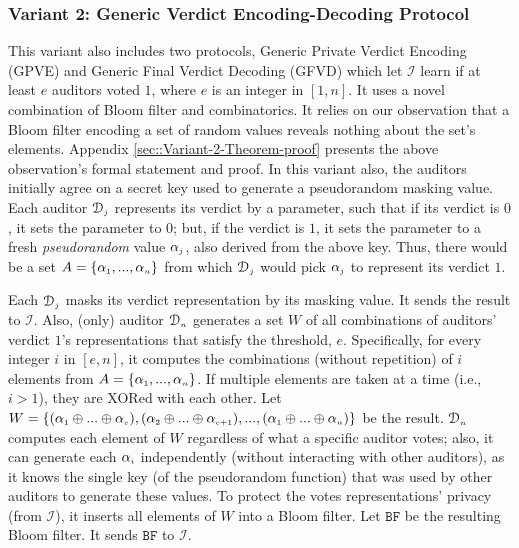 \vspace{-2mm}
\subsubsection{Variant 2: Generic Verdict  Encoding-Decoding Protocol} This variant also includes two protocols, Generic Private Verdict Encoding (GPVE) and Generic Final Verdict Decoding (GFVD) which let $\mathcal{I}$ learn if at least $e$ auditors voted $1$, where $e$ is an integer in  $[1, n]$. It uses a novel combination of   Bloom filter and combinatorics. It relies on our observation that a Bloom filter encoding a set of random values reveals nothing about the set's elements.  Appendix \ref{sec::Variant-2-Theorem-proof} presents the above observation's formal statement and proof.  
%
In this variant also, the auditors initially agree on a secret key used  to generate a pseudorandom masking value. Each auditor $\mathcal{D}_{\scriptscriptstyle j}$ represents its verdict by a parameter, such that if its verdict is $0$,   it sets the parameter to  $0$; but, if   the verdict is $1$, it sets the parameter to a fresh \emph{pseudorandom} value $\alpha_{\scriptscriptstyle j}$, also derived from the above key. Thus, there would be a set $A=\{\alpha_{\scriptscriptstyle 1},..., \alpha_{\scriptscriptstyle n}\}$ from which   $\mathcal{D}_{\scriptscriptstyle j}$ would pick $\alpha_{\scriptscriptstyle j}$ to represent its verdict $1$. 

Each $\mathcal{D}_{\scriptscriptstyle j}$ masks its verdict representation by its masking value. It sends the result to $\mathcal{I}$. Also, (only) auditor $\mathcal{D}_{\scriptscriptstyle n}$  generates a set $W$  of all combinations of auditors' verdict $1$'s representations that satisfy the threshold, $e$.  Specifically,  for every integer $i$ in $[e, n]$, it computes the combinations (without repetition) of $i$ elements from  $A=\{\alpha_{\scriptscriptstyle 1},..., \alpha_{\scriptscriptstyle n}\}$. If multiple elements are taken at a time (i.e., $i>1$), they are XORed with each other.   Let $W=\{(\alpha_{\scriptscriptstyle 1}\oplus ... \oplus \alpha_{\scriptscriptstyle e}),  (\alpha_{\scriptscriptstyle 2}\oplus  ... \oplus \alpha_{\scriptscriptstyle e+1}), ..., (\alpha_{\scriptscriptstyle 1}\oplus ... \oplus \alpha_{\scriptscriptstyle n})\}$ be the result. 
%
$\mathcal{D}_{\scriptscriptstyle n}$ computes each element of $W$ regardless of what a specific auditor votes; also, it can generate each   $\alpha_{\scriptscriptstyle i}$ independently (without interacting with other auditors), as it knows the single key (of the pseudorandom function) that was used by other auditors to generate these values.  
 To protect the votes representations' privacy (from $\mathcal{I}$), it inserts all elements of $W$ into a Bloom filter. Let $\mathtt{BF}$ be the resulting Bloom filter. It sends $\mathtt{BF}$ to $\mathcal{I}$. 



